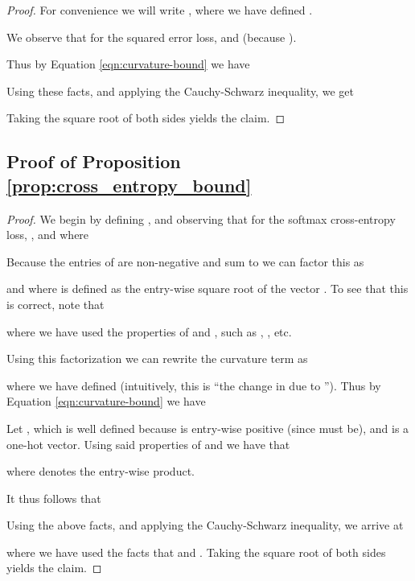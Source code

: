 \documentclass{article}
\theoremstyle{plain}
\theoremstyle{definition}
\theoremstyle{remark}
\begin{document}
\begin{proof}
  For convenience we will write , where
  we have defined .
  
  We observe that for the squared error loss, 
  and  (because ).
  
  Thus by Equation \ref{eqn:curvature-bound} we have
  
  Using these facts, and applying the Cauchy-Schwarz inequality, we get
  
  Taking the square root of both sides yields the claim.
\end{proof}

\subsection{Proof of Proposition \ref{prop:cross_entropy_bound}}

\begin{proof}
  We begin by defining , and observing that for the softmax
  cross-entropy loss, , and  where
  
  Because the entries of  are non-negative and sum to  we can factor
  this as
  
  and where  is defined as the entry-wise square root of the vector . To
  see that this is correct, note that
  
  where we have used the properties of  and , such as ,
  , etc.
  
  Using this factorization we can rewrite the curvature term as
  
  where we have defined  (intuitively, this is ``the
  change in  due to ''). Thus by Equation \ref{eqn:curvature-bound}
  we have
  
  Let , which is well defined because  is
  entry-wise positive (since  must be), and  is a one-hot vector. Using
  said properties of  and  we have that
  
  where  denotes the entry-wise product.
  
  It thus follows that
  
  Using the above facts, and applying the Cauchy-Schwarz inequality, we arrive
  at
  
  where we have used the facts that  and . Taking the square root of both sides yields the claim.
\end{proof}
\end{document}
